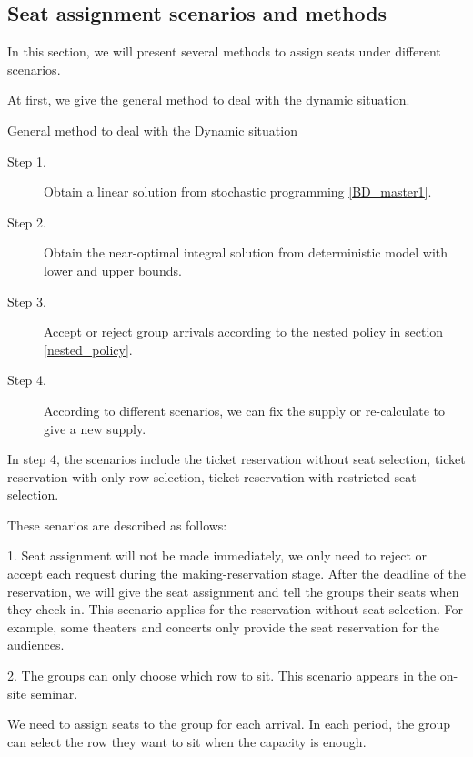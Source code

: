 \subsection{Seat assignment scenarios and methods}
In this section, we will present several methods to assign seats under different scenarios.

At first, we give the general method to deal with the dynamic situation.

\begin{algorithm}[H]\label{general_method}
  \caption{General method to deal with the Dynamic situation}
  \begin{description}
    \item[Step 1.] Obtain a linear solution from stochastic programming \eqref{BD_master1}.
    \item[Step 2.] Obtain the near-optimal integral solution from deterministic model with lower and upper bounds.
    \item[Step 3.] Accept or reject group arrivals according to the nested policy in section \ref{nested_policy}.
    \item[Step 4.] According to different scenarios, we can fix the supply or re-calculate to give a new supply. 
  \end{description}
\end{algorithm}

In step 4, the scenarios include the ticket reservation without seat selection, ticket reservation with only row selection, ticket reservation with restricted seat selection. 


These senarios are described as follows:

1. Seat assignment will not be made immediately, we only need to reject or accept each request during the making-reservation stage. After the deadline of the reservation, we will give the seat assignment and tell the groups their seats when they check in. This scenario applies for the reservation without seat selection. For example, some theaters and concerts only provide the seat reservation for the audiences.

2. The groups can only choose which row to sit. This scenario appears in the on-site seminar. 

We need to assign seats to the group for each arrival. In each period, the group can select the row they want to sit when the capacity is enough. 

